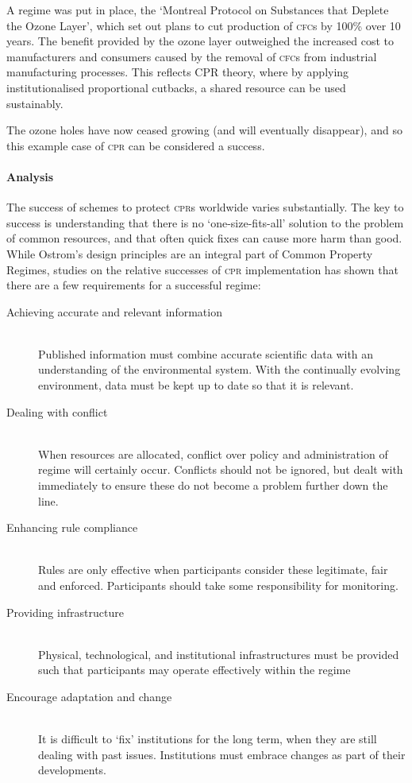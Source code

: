 A regime was put in place, the `Montreal Protocol on Substances that Deplete the Ozone Layer', which set out plans to cut production of \textsc{cfc}s by 100\% over 10 years. The benefit provided by the ozone layer outweighed the increased cost to manufacturers and consumers caused by the removal of \textsc{cfc}s from industrial manufacturing processes. This reflects CPR theory, where by applying institutionalised proportional cutbacks, a shared resource can be used sustainably.

The ozone holes have now ceased growing (and will eventually disappear), and so this example case of \textsc{cpr} can be considered a success.

\paragraph{Analysis}

The success of schemes to protect \textsc{cpr}s worldwide varies substantially. The key to success is understanding that there is no `one-size-fits-all' solution to the problem of common resources, and that often quick fixes can cause more harm than good. While Ostrom's design principles are an integral part of Common Property Regimes, studies on the relative successes of \textsc{cpr} implementation has shown that there are a few requirements for a successful regime:~\cite{Ostrom-challenge-90}

\begin{description}
	\item[Achieving accurate and relevant information] \hfill \\
	Published information must combine accurate scientific data with an understanding of the environmental system. With the continually evolving environment, data must be kept up to date so that it is relevant. 
	
	\item[Dealing with conflict] \hfill \\
	When resources are allocated, conflict over policy and administration of regime will certainly occur. Conflicts should not be ignored, but dealt with immediately to ensure these do not become a problem further down the line. 

	\item[Enhancing rule compliance] \hfill \\
	Rules are only effective when participants consider these legitimate, fair and enforced. Participants should take some responsibility for monitoring.
	
	\item[Providing infrastructure] \hfill \\
	Physical, technological, and institutional infrastructures must be provided such that participants may operate effectively within the regime
	
	\item[Encourage adaptation and change] \hfill \\
	It is difficult to `fix' institutions for the long term, when they are still dealing with past issues. Institutions must embrace changes as part of their developments.
\end{description}

